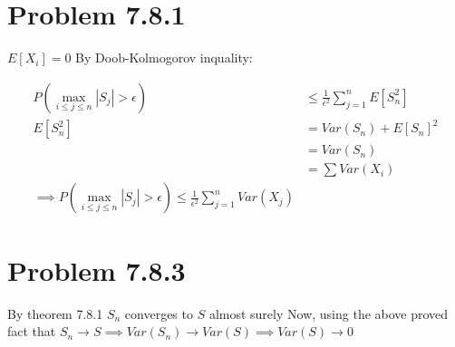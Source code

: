 \documentclass[a4paper]{article}
\begin{document}
\section*{Problem 7.8.1}
$E[X_i]=0$ 
By Doob-Kolmogorov inquality: 

\begin{align*}
P(\max_{i\leq j \leq n} |S_j| > \epsilon) &\leq \frac{1}{\epsilon^2} \sum_{j=1}^{n}E[S_n^2]\\
E[S_n^2] &= Var(S_n)+E[S_n]^2\\
&= Var(S_n)\\
&= \sum Var(X_i)\\
\implies P(\max_{i\leq j \leq n} |S_j| > \epsilon) \leq \frac{1}{\epsilon^2} \sum_{j=1}^{n}Var(X_j)
\end{align*}

\section*{Problem 7.8.3}
By theorem 7.8.1 $S_n$ converges to $S$ almost surely
Now, using the above proved fact that $S_n \longrightarrow S \implies Var(S_n) \longrightarrow Var(S) \implies Var(S) \longrightarrow 0$
\end{document}
